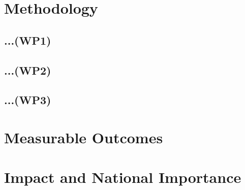 \documentclass[11pt,english,twocolumn]{article}
\begin{document}
\section{Methodology}

\subsection*{...(WP1)}

\subsection*{...(WP2)}

\subsection*{...(WP3)}

\section{Measurable Outcomes}

\section{Impact and National Importance}

\let\oldbibliography\thebibliography
\renewcommand{\thebibliography}[1]{\oldbibliography{#1}
\setlength{\itemsep}{-3pt}}


{
\scriptsize

}
\end{document}
